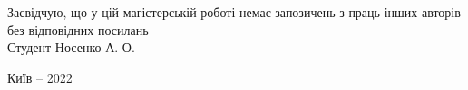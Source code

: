 \begin{titlepage}
\hfill\parbox{10cm}{
\begin{flushleft}
 \begin{center}
 \small
     Засвідчую, що у цій магістерській роботі немає 
     запозичень з праць інших авторів без відповідних посилань \\
     Студент \underline{\hspace{4cm}} Носенко А. О.
 \end{center}
\end{flushleft}}

\vfill

\begin{center}
 Київ -- 2022
\end{center}
\end{titlepage}